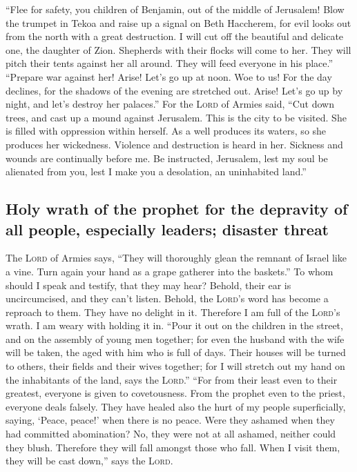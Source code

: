  ``Flee for safety, you children of Benjamin, out of the
middle of Jerusalem! Blow the trumpet in Tekoa and raise up a signal on
Beth Haccherem, for evil looks out from the north with a great
destruction.  I will cut off the beautiful and delicate
one, the daughter of Zion.  Shepherds with their flocks
will come to her. They will pitch their tents against her all around.
They will feed everyone in his place.''  ``Prepare war
against her! Arise! Let's go up at noon. Woe to us! For the day
declines, for the shadows of the evening are stretched out.
 Arise! Let's go up by night, and let's destroy her
palaces.''  For the \textsc{Lord} of Armies said, ``Cut
down trees, and cast up a mound against Jerusalem. This is the city to
be visited. She is filled with oppression within herself. 
As a well produces its waters, so she produces her wickedness. Violence
and destruction is heard in her. Sickness and wounds are continually
before me.  Be instructed, Jerusalem, lest my soul be
alienated from you, lest I make you a desolation, an uninhabited land.''

\hypertarget{holy-wrath-of-the-prophet-for-the-depravity-of-all-people-especially-leaders-disaster-threat}{%
\subsection{Holy wrath of the prophet for the depravity of all people,
especially leaders; disaster
threat}\label{holy-wrath-of-the-prophet-for-the-depravity-of-all-people-especially-leaders-disaster-threat}}

 The \textsc{Lord} of Armies says, ``They will thoroughly
glean the remnant of Israel like a vine. Turn again your hand as a grape
gatherer into the baskets.''  To whom should I speak and
testify, that they may hear? Behold, their ear is uncircumcised, and
they can't listen. Behold, the \textsc{Lord}'s word has become a
reproach to them. They have no delight in it.  Therefore
I am full of the \textsc{Lord}'s wrath. I am weary with holding it in.
``Pour it out on the children in the street, and on the assembly of
young men together; for even the husband with the wife will be taken,
the aged with him who is full of days.  Their houses will
be turned to others, their fields and their wives together; for I will
stretch out my hand on the inhabitants of the land, says the
\textsc{Lord}.''  ``For from their least even to their
greatest, everyone is given to covetousness. From the prophet even to
the priest, everyone deals falsely.  They have healed
also the hurt of my people superficially, saying, `Peace, peace!' when
there is no peace.  Were they ashamed when they had
committed abomination? No, they were not at all ashamed, neither could
they blush. Therefore they will fall amongst those who fall. When I
visit them, they will be cast down,'' says the \textsc{Lord}.

